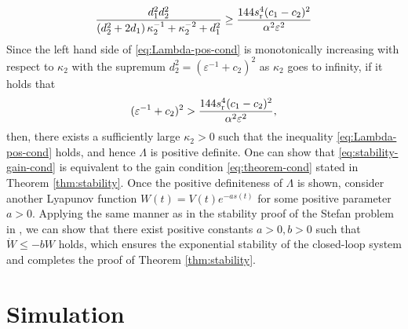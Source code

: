 \documentclass[letterpaper, 10 pt, conference]{cls/ieeeconf}
\theoremstyle{definition}
\newcommand{\ep}{\varepsilon}
\begin{document}
\begin{align}
 \frac{ d_1^2 d_2^2 }{ \left( d_2^2 
 + 2 d_1 \right) \kappa_2^{-1} + \kappa_2^{-2} + d_1^2  } \geq \frac{144 s_{\rm r}^4(c_1 - c_2)^2}{\alpha^2 \ep^{2}  } \label{eq:Lambda-pos-cond}
\end{align}
Since the left hand side of \eqref{eq:Lambda-pos-cond} is monotonically increasing with respect to $\kappa_2$ with the supremum $d_2^2 = ( \ep^{-1} + c_2)^2$ as $\kappa_2$ goes to infinity, if it holds that 
\begin{align}
     ( \ep^{-1} + c_2)^2 > \frac{144 s_{\rm r}^4(c_1 - c_2)^2}{\alpha^2 \ep^{2}  }, \label{eq:stability-gain-cond}
\end{align}
then, there exists a sufficiently large $\kappa_2>0$ such that the inequality \eqref{eq:Lambda-pos-cond} holds, and hence $\Lambda$ is positive definite. One can show that \eqref{eq:stability-gain-cond} is equivalent to the gain condition \eqref{eq:theorem-cond} stated in Theorem \ref{thm:stability}. 
Once the positive definiteness of $\Lambda$ is shown, consider another Lyapunov function $W(t) = V(t) e^{ -  a s(t)}$ for some positive parameter $a>0$. Applying the same manner as in the stability proof of the Stefan problem in \cite{Shumon19journal}, 
we can show that there exist positive constants $a>0, b>0$ such that $\dot W \leq - b W$ holds,   
which ensures the exponential stability of the closed-loop system and completes the proof of Theorem \ref{thm:stability}. 
\section{Simulation} \label{sec:simulation}
\end{document}
